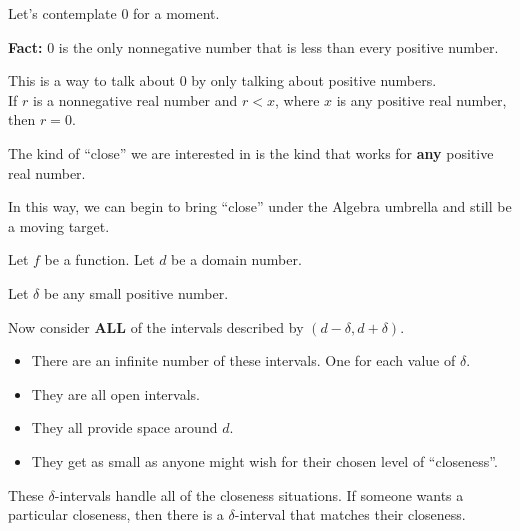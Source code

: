 \documentclass{ximera}
\begin{document}
Let's contemplate $0$ for a moment. \\

\begin{fact}


\textbf{Fact:} $0$ is the only nonnegative number that is less than every positive number.


\end{fact}

This is a way to talk about $0$ by only talking about positive numbers. \\



If $r$ is a nonnegative real number and $r < x$, where $x$ is any positive real number, then $r = 0$.







\begin{idea}


The kind of ``close'' we are interested in is the kind that works for \textbf{\textcolor{purple!85!blue}{any}} positive real number.


\end{idea}






In this way, we can begin to bring ``close'' under the Algebra umbrella and still be a moving target.


Let $f$ be a function. Let $d$ be a domain number.

Let $\delta$ be any small positive number.

Now consider \textbf{\textcolor{red!70!black}{ALL}} of the intervals described by $(d - \delta, d + \delta)$.


\begin{itemize}
\item There are an infinite number of these intervals. One for each value of $\delta$.
\item They are all open intervals.
\item They all provide space around $d$.
\item They get as small as anyone might wish for their chosen level of ``closeness''.
\end{itemize}

These $\delta$-intervals handle all of the closeness situations.  If someone wants a particular closeness, then there is a $\delta$-interval that matches their closeness.
\end{document}
